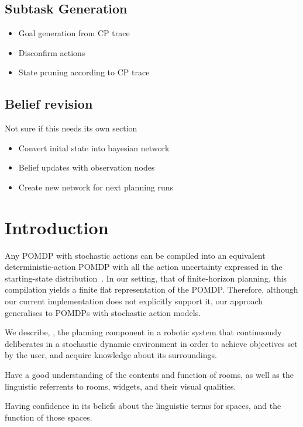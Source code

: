 \documentclass[letterpaper]{article}
\begin{document}
\subsection{Subtask Generation}
\begin{itemize}
\item Goal generation from CP trace
\item Disconfirm actions
\item State pruning according to CP trace
\end{itemize}

\subsection{Belief revision}
Not sure if this needs its own section
\begin{itemize}
\item Convert inital state into bayesian network
\item Belief updates with observation nodes
\item Create new network for next planning runs
\end{itemize}

\section{Introduction}


Any POMDP with stochastic actions can be compiled into an equivalent
deterministic-action POMDP with all the action uncertainty expressed
in the starting-state distribution~\cite{ng:Jordan:2000}. In our
setting, that of finite-horizon planning, this compilation yields a
finite flat representation of the POMDP. Therefore, although our
current implementation does not explicitly support it, our approach
generalises to POMDPs with stochastic action models.




We describe, \pcogx, the planning component in a robotic system that
continuously deliberates in a stochastic dynamic environment in order
to achieve objectives set by the user, and acquire knowledge about its
surroundings.

Have a good understanding of the contents and function of rooms, as
well as the linguistic referrents to rooms, widgets, and their visual
qualities.

Having confidence in its beliefs about the linguistic terms for
spaces, and the function of those spaces.
\end{document}

